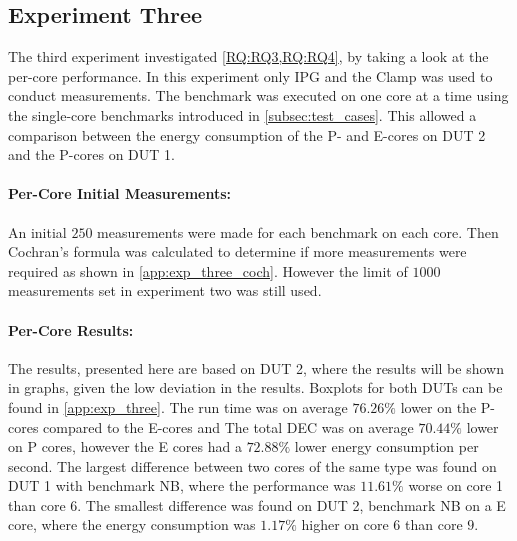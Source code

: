 \subsection{Experiment Three}\label{subsec:exp_three}

The third experiment investigated \cref{RQ:RQ3,RQ:RQ4}, by taking a look at the per-core performance. In this experiment only IPG and the Clamp was used to conduct measurements. The benchmark was executed on one core at a time using the single-core benchmarks introduced in \cref{subsec:test_cases}. This allowed a comparison between the energy consumption of the P- and E-cores on DUT 2 and the P-cores on DUT 1.


\paragraph{Per-Core Initial Measurements:} An initial $250$ measurements were made for each benchmark on each core. Then Cochran's formula was calculated to determine if more measurements were required as shown in \cref{app:exp_three_coch}. However the limit of $1000$ measurements set in experiment two was still used.




\paragraph{Per-Core Results:} The results, presented here are based on DUT 2, where the results will be shown in graphs, given the low deviation in the results. Boxplots for both DUTs can be found in \cref{app:exp_three}. The run time was on average $76.26\%$ lower on the P-cores compared to the E-cores and The total DEC was on average $70.44\%$ lower on P cores, however the E cores had a $72.88\%$ lower energy consumption per second. %
The largest difference between two cores of the same type was found on DUT 1 with benchmark NB, where the performance was $11.61\%$ worse on core 1 than core 6. The smallest difference was found on DUT 2, benchmark NB on a E core, where the energy consumption was $1.17\%$ higher on core $6$ than core $9$.




